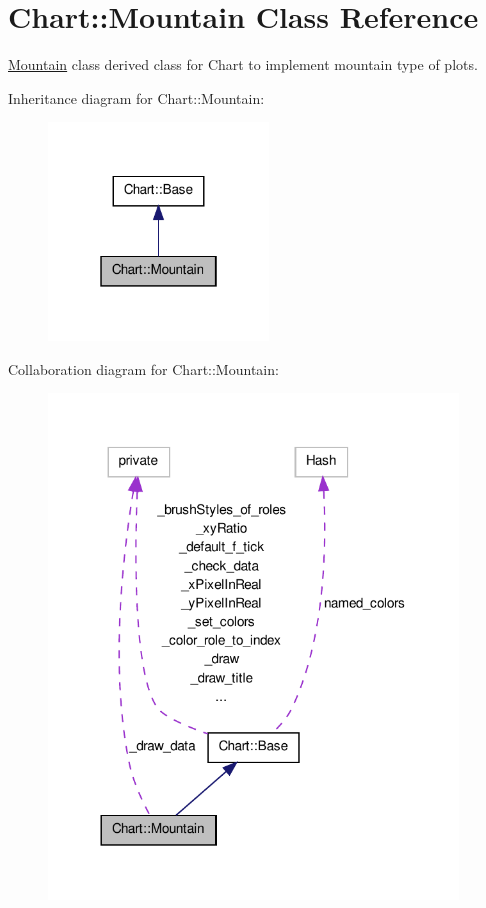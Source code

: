 \hypertarget{classChart_1_1Mountain}{
\section{Chart::Mountain Class Reference}
\label{classChart_1_1Mountain}
}


\hyperlink{classChart_1_1Mountain}{Mountain} class derived class for Chart to implement mountain type of plots.  




Inheritance diagram for Chart::Mountain:\nopagebreak
\begin{figure}[H]
\begin{center}
\leavevmode
\includegraphics[width=166pt]{classChart_1_1Mountain__inherit__graph}
\end{center}
\end{figure}


Collaboration diagram for Chart::Mountain:\nopagebreak
\begin{figure}[H]
\begin{center}
\leavevmode
\includegraphics[width=308pt]{classChart_1_1Mountain__coll__graph}
\end{center}
\end{figure}
